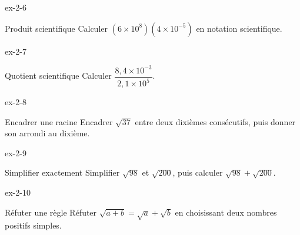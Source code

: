 \clearpage{}
\begin{blocLivre}{ex-2-6}\begin{exercice}[2]{Produit scientifique}
Calculer $(6\times10^8)(4\times10^{-5})$ en notation scientifique.
\end{exercice}\end{blocLivre}
\begin{blocLivre}{ex-2-7}\begin{exercice}[2]{Quotient scientifique}
Calculer $\dfrac{8{,}4\times10^{-3}}{2{,}1\times10^5}$.
\end{exercice}\end{blocLivre}
\begin{blocLivre}{ex-2-8}\begin{exercice}[2]{Encadrer une racine}
Encadrer $\sqrt{37}$ entre deux dixièmes consécutifs, puis donner son arrondi au dixième.
\end{exercice}\end{blocLivre}
\begin{blocLivre}{ex-2-9}\begin{exercice}[2]{Simplifier exactement}
Simplifier $\sqrt{98}$ et $\sqrt{200}$, puis calculer $\sqrt{98}+\sqrt{200}$.
\end{exercice}\end{blocLivre}
\begin{blocLivre}{ex-2-10}\begin{exercice}[2]{Réfuter une règle}
Réfuter $\sqrt{a+b}=\sqrt a+\sqrt b$ en choisissant deux nombres positifs simples.
\end{exercice}\end{blocLivre}

